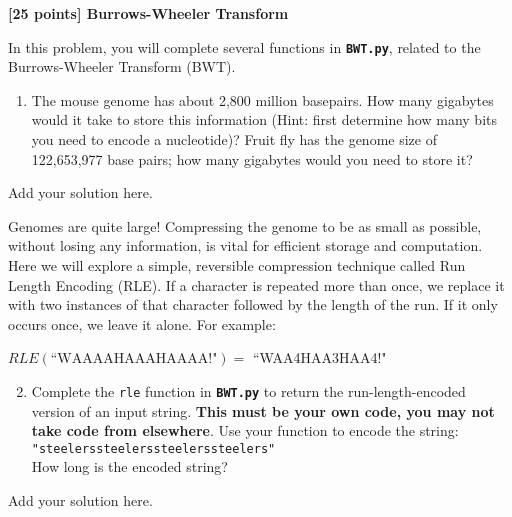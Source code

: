 {\bf [25 points] Burrows-Wheeler Transform}\\

\vspace{0.1in}

In this problem, you will complete several functions in \textbf{\texttt{BWT.py}}, related to the Burrows-Wheeler Transform (BWT).

\begin{enumerate}
    \item The mouse genome has about 2,800 million basepairs. How many gigabytes would it take to store this information (Hint: first determine how many bits you need to encode a nucleotide)? Fruit fly has the genome size of 122,653,977 base pairs; how many gigabytes would you need to store it?
\end{enumerate}

\begin{solution}
Add your solution here.
\end{solution}

Genomes are quite large! Compressing the genome to be as small as possible, without losing any information, is vital for efficient storage and computation. Here we will explore a simple, reversible compression technique called Run Length Encoding (RLE). If a character is repeated more than once, we replace it with two instances of that character followed by the length of the run. If it only occurs once, we leave it alone. For example:

{
\begin{center}
    $RLE(\textrm{``WAAAAHAAAHAAAA!"}) = $ ``WAA4HAA3HAA4!"
\end{center}
}

\begin{enumerate}
  \setcounter{enumii}{1}
  \item \label{scottytartan} Complete the \texttt{rle} function in \textbf{\texttt{BWT.py}} to return the run-length-encoded version of an input string. \textbf{This must be your own code, you may not take code from elsewhere}. Use your function to encode the string:\\
  \texttt{"steelerssteelerssteelerssteelers"}\\How long is the encoded string?
\end{enumerate}

\begin{solution}
Add your solution here.
\end{solution}

